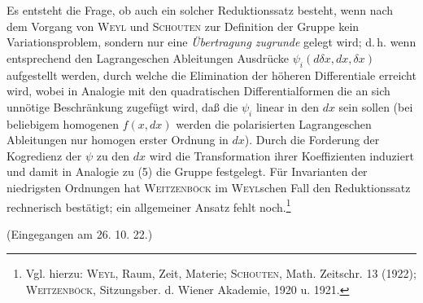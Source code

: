 Es entsteht die Frage, ob auch ein solcher Reduktionssatz besteht, wenn nach dem Vorgang von \textsc{Weyl} und \textsc{Schouten} zur Definition der Gruppe kein Variationsproblem, sondern nur eine \emph{Übertragung zugrunde} gelegt wird; d.\,h. wenn entsprechend den Lagrangeschen Ableitungen Ausdrücke $\psi_i(d\delta x,d x,\delta x)$ aufgestellt werden, durch welche die Elimination der höheren Differentiale erreicht wird, wobei in Analogie mit den quadratischen Differentialformen die an sich unnötige Beschränkung zugefügt wird, daß die $\psi_i$ linear in den $d x$ sein sollen (bei beliebigem homogenen $f(x,d x)$ werden die polarisierten Lagrangeschen Ableitungen nur homogen erster Ordnung in $d x$). Durch die Forderung der Kogredienz der $\psi$ zu den $d x$ wird die Transformation ihrer Koeffizienten induziert und damit in Analogie zu (5) die Gruppe festgelegt. Für Invarianten der niedrigsten Ordnungen hat \textsc{Weitzenböck} im \textsc{Weyl}schen Fall den Reduktionssatz rechnerisch bestätigt; ein allgemeiner Ansatz fehlt noch.\footnote{Vgl. hierzu: \textsc{Weyl}, Raum, Zeit, Materie; \textsc{Schouten}, Math. Zeitschr. 13 (1922); \textsc{Weitzenböck}, Sitzungsber. d. Wiener Akademie, 1920 u. 1921.}

\begin{center}
(Eingegangen am 26. 10. 22.)
\end{center}
\endgroup

\clearpage
\setcounter{footnote}{0}
